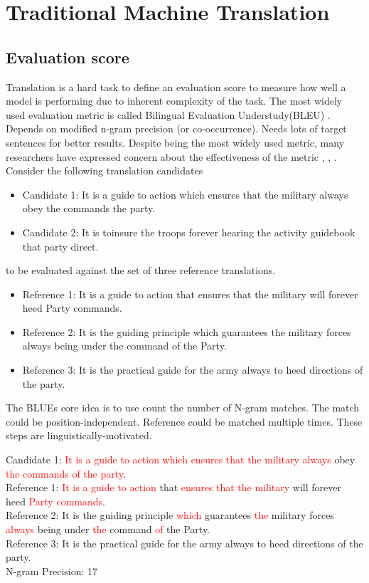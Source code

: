 \documentclass[a4paper]{article}
\newcommand{\red}[1]{\textcolor{red}{#1}}
\begin{document}
\section{Traditional Machine Translation}


\subsection{Evaluation score} Translation is a hard task to define an evaluation
score to  measure how  well a model  is performing due to inherent complexity of
the task. The most widely  used evaluation metric is called Bilingual Evaluation
Understudy(BLEU) \cite{papineni2002bleu}.  Depends on  modified n-gram precision
(or  co-occurrence). Needs  lots of target sentences for better results. Despite
being the most widely used metric, many researchers have expressed concern about
the    effectiveness     of     the     metric     \cite{zhang2004interpreting},
\cite{callison2006re}, \cite{ananthakrishnan2007some}.  Consider  the  following
translation candidates


\begin{itemize}
  \item Candidate 1: It is  a  guide to action which ensures that  the  military
        always obey  the commands the  party.
  \item Candidate 2: It is  toinsure the troops  forever  hearing  the  activity
        guidebook that party  direct.
\end{itemize}


to be evaluated against the set of three reference translations.


\begin{itemize}
  \item Reference 1: It is a guide to action that ensures that the military will
        forever heed Party commands.
  \item Reference 2: It is the  guiding  principle which guarantees the military
        forces always being under the command of the Party.
  \item Reference 3: It  is  the  practical  guide  for  the army always to heed
        directions of the party.
\end{itemize}


The  BLUEs core idea is to use  count the  number  of N-gram  matches. The match
could  be position-independent. Reference could be matched multiple times. These
steps are linguistically-motivated.


Candidate  1:  \red{It is  a  guide to action which  ensures  that  the military
always} obey \red{the commands of the party}. \\
Reference 1: \red{It is a guide  to action} that \red{ensures that the military}
will forever heed \red{Party commands}. \\
Reference  2:  It  is  the  guiding principle  \red{which}  guarantees \red{the}
military forces \red{always}  being under  \red{the} command \red{of} the Party.
\\
Reference 3: It is the practical guide for the army always to heed directions of
the party. \\
N-gram Precision: 17
\end{document}
